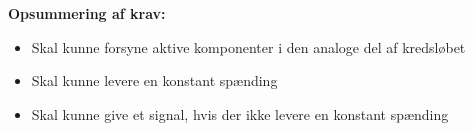 \vspace{3mm}
\textbf{Opsummering af krav:}
\begin{itemize} 
\item[\text{\sffamily \checkmark}] Skal kunne forsyne aktive komponenter i den analoge del af kredsløbet
\item[\text{\sffamily \checkmark}] Skal kunne levere en konstant spænding
\item[\text{\sffamily \checkmark}] Skal kunne give et signal, hvis der ikke levere en konstant spænding
\end{itemize}

